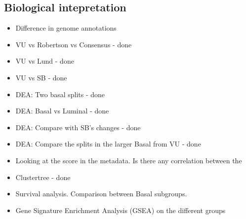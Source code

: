 \subsection{Biological intepretation}


\begin{itemize}
    \item Difference in genome annotations
    \item VU vs Robertson vs Consensus - done
    \item VU vs Lund - done
    \item VU vs SB - done
    \item DEA: Two basal splits - done
    \item DEA: Basal vs Luminal - done
    \item DEA: Compare with SB's changes - done
    \item DEA: Compare the splits in the larger Basal from VU - done
    \item Looking at the score in the metadata. Is there any correlation between the 
    \item Clustertree - done
    \item Survival analysis. Comparison between Basal subgroups.
    \item Gene Signature Enrichment Analysis (GSEA) on the different groups 
\end{itemize}